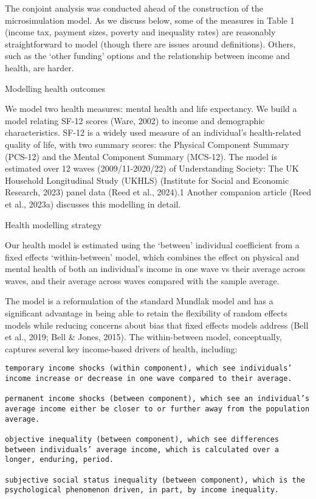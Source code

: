 \documentclass[
  letterpaper,
  DIV=11,
  numbers=noendperiod]{scrartcl}
\begin{document}
The conjoint analysis was conducted ahead of the construction of the
microsimulation model. As we discuss below, some of the measures in
Table 1 (income tax, payment sizes, poverty and inequality rates) are
reasonably straightforward to model (though there are issues around
definitions). Others, such as the `other funding' options and the
relationship between income and health, are harder.

Modelling health outcomes

We model two health measures: mental health and life expectancy. We
build a model relating SF-12 scores (Ware, 2002) to income and
demographic characteristics. SF-12 is a widely used measure of an
individual's health-related quality of life, with two summary scores:
the Physical Component Summary (PCS-12) and the Mental Component Summary
(MCS-12). The model is estimated over 12 waves (2009/11-2020/22) of
Understanding Society: The UK Household Longitudinal Study (UKHLS)
(Institute for Social and Economic Research, 2023) panel data (Reed et
al., 2024).1 Another companion article (Reed et al., 2023a) discusses
this modelling in detail.

Health modelling strategy

Our health model is estimated using the `between' individual coefficient
from a fixed effects `within-between' model, which combines the effect
on physical and mental health of both an individual's income in one wave
vs their average across waves, and their average across waves compared
with the sample average.

The model is a reformulation of the standard Mundlak model and has a
significant advantage in being able to retain the flexibility of random
effects models while reducing concerns about bias that fixed effects
models address (Bell et al., 2019; Bell \& Jones, 2015). The
within-between model, conceptually, captures several key income-based
drivers of health, including:

\begin{verbatim}
temporary income shocks (within component), which see individuals’ income increase or decrease in one wave compared to their average. 

permanent income shocks (between component), which see an individual’s average income either be closer to or further away from the population average. 

objective inequality (between component), which see differences between individuals’ average income, which is calculated over a longer, enduring, period. 

subjective social status inequality (between component), which is the psychological phenomenon driven, in part, by income inequality. 
\end{verbatim}
\end{document}
